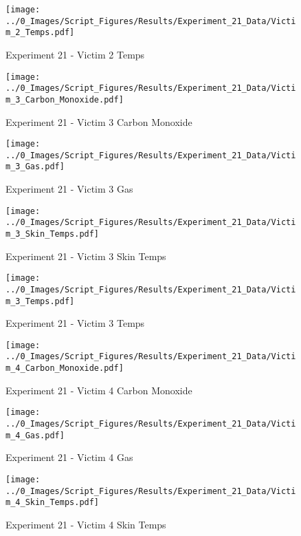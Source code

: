	\clearpage

	\begin{figure}[H]
		\centering
		\texttt{[image: ../0\_Images/Script\_Figures/Results/Experiment\_21\_Data/Victim\_2\_Temps.pdf]}
		\caption[]{Experiment 21 - Victim 2 Temps}
	\end{figure}
 

	\begin{figure}[H]
		\centering
		\texttt{[image: ../0\_Images/Script\_Figures/Results/Experiment\_21\_Data/Victim\_3\_Carbon\_Monoxide.pdf]}
		\caption[]{Experiment 21 - Victim 3 Carbon Monoxide}
	\end{figure}
 
	\clearpage

	\begin{figure}[H]
		\centering
		\texttt{[image: ../0\_Images/Script\_Figures/Results/Experiment\_21\_Data/Victim\_3\_Gas.pdf]}
		\caption[]{Experiment 21 - Victim 3 Gas}
	\end{figure}
 

	\begin{figure}[H]
		\centering
		\texttt{[image: ../0\_Images/Script\_Figures/Results/Experiment\_21\_Data/Victim\_3\_Skin\_Temps.pdf]}
		\caption[]{Experiment 21 - Victim 3 Skin Temps}
	\end{figure}
 
	\clearpage

	\begin{figure}[H]
		\centering
		\texttt{[image: ../0\_Images/Script\_Figures/Results/Experiment\_21\_Data/Victim\_3\_Temps.pdf]}
		\caption[]{Experiment 21 - Victim 3 Temps}
	\end{figure}
 

	\begin{figure}[H]
		\centering
		\texttt{[image: ../0\_Images/Script\_Figures/Results/Experiment\_21\_Data/Victim\_4\_Carbon\_Monoxide.pdf]}
		\caption[]{Experiment 21 - Victim 4 Carbon Monoxide}
	\end{figure}
 
	\clearpage

	\begin{figure}[H]
		\centering
		\texttt{[image: ../0\_Images/Script\_Figures/Results/Experiment\_21\_Data/Victim\_4\_Gas.pdf]}
		\caption[]{Experiment 21 - Victim 4 Gas}
	\end{figure}
 

	\begin{figure}[H]
		\centering
		\texttt{[image: ../0\_Images/Script\_Figures/Results/Experiment\_21\_Data/Victim\_4\_Skin\_Temps.pdf]}
		\caption[]{Experiment 21 - Victim 4 Skin Temps}
	\end{figure}
 

